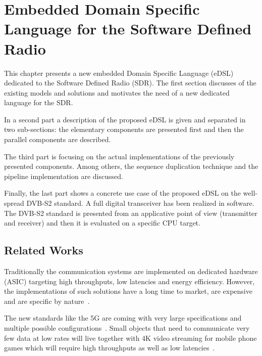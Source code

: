 
\graphicspath{{main/chapter6/fig/}}

\chapter{Embedded Domain Specific Language for the Software Defined Radio}

This chapter presents a new embedded Domain Specific Language (eDSL) dedicated
to the Software Defined Radio (SDR). The first section discusses of the existing
models and solutions and motivates the need of a new dedicated language for the
SDR.

In a second part a description of the proposed eDSL is given and separated in
two sub-sections: the elementary components are presented first and then the
parallel components are described.

The third part is focusing on the actual implementations of the previously
presented components. Among others, the sequence duplication technique and the
pipeline implementation are discussed.

Finally, the last part shows a concrete use case of the proposed eDSL on the
well-spread DVB-S2 standard. A full digital transceiver has been realized in
software. The DVB-S2 standard is presented from an applicative point of view
(transmitter and receiver) and then it is evaluated on a specific CPU target.

\vspace*{\fill}
\minitoccustom
\vspace*{\fill}

\section{Related Works}

Traditionally the communication systems are implemented on dedicated hardware
(ASIC) targeting high throughputs, low latencies and energy efficiency.
However, the implementations of such solutions have a long time to market, are
expensive and are specific by nature~\cite{Palkovic2010,Palkovic2012}.

The new standards like the 5G are coming with very large specifications and
multiple possible configurations~\cite{ETSI2018}. Small objects that need to
communicate very few data at low rates will live together with 4K video
streaming for mobile phone games which will require high throughputs as well as
low latencies~\cite{Rost2014}.

